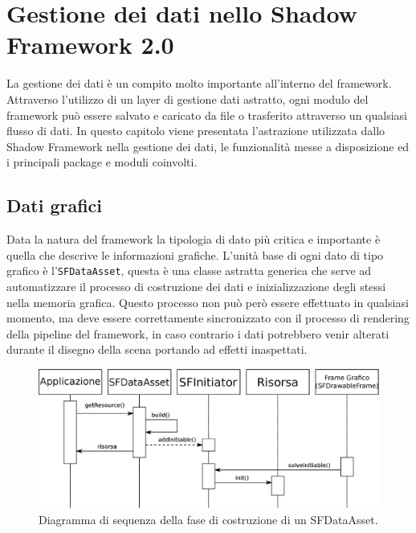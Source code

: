 
\chapter{Gestione dei dati nello Shadow Framework 2.0}
\label{ch:gestionedati}

La gestione dei dati \`e un compito molto importante all'interno del framework. Attraverso l'utilizzo di un layer di gestione dati astratto, ogni modulo del framework pu\`o essere salvato e caricato da file o trasferito attraverso un qualsiasi flusso di dati.
In questo capitolo viene presentata l'astrazione utilizzata dallo Shadow Framework nella gestione dei dati, le funzionalit\`a messe a disposizione ed i principali package e moduli coinvolti.

\section{Dati grafici}
\label{sec:dati grafici}
Data la natura del framework la tipologia di dato pi\`u critica e importante \`e quella che descrive le informazioni grafiche. 
L'unit\`a base di ogni dato di tipo grafico \`e l'\texttt{SFDataAsset}, questa \`e una classe astratta generica che serve ad automatizzare il processo di costruzione dei dati e inizializzazione degli stessi nella memoria grafica. Questo processo non pu\`o per\`o essere effettuato in qualsiasi momento, ma deve essere correttamente sincronizzato con il processo di rendering della pipeline del framework, in caso contrario i dati potrebbero venir alterati durante il disegno della scena portando ad effetti inaspettati.

\begin{figure}
\begin{center}
\includegraphics[width=\textwidth]{Immagini/sequenzaDataAsset}
\caption[Diagramma della fase di costruzione di un SFDataAsset.]{Diagramma di sequenza della fase di costruzione di un SFDataAsset.\label{f:seqdataasset}} 
\end{center} 
\end{figure}

